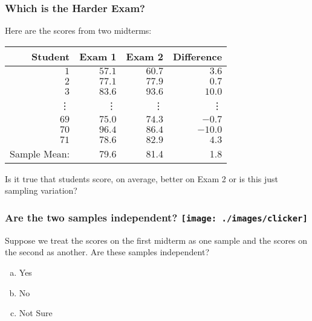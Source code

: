\begin{frame}
\frametitle{Which is the Harder Exam?}
Here are the scores from two midterms:
%
\begin{table}[!tbp]
\begin{center}
\begin{tabular}{rrrr}
\hline\hline
\multicolumn{1}{r}{Student}&\multicolumn{1}{r}{Exam 1}&\multicolumn{1}{r}{Exam 2}&\multicolumn{1}{r}{Difference}\tabularnewline
\hline
$ 1$&$57.1$&$60.7$&$  3.6$\tabularnewline
$ 2$&$77.1$&$77.9$&$  0.7$\tabularnewline
$ 3$&$83.6$&$93.6$&$ 10.0$\tabularnewline
\vdots&\vdots&\vdots&\vdots\\
$69$&$75.0$&$74.3$&$ -0.7$\tabularnewline
$70$&$96.4$&$86.4$&$-10.0$\tabularnewline
$71$&$78.6$&$82.9$&$  4.3$\tabularnewline
\hline
Sample Mean: & 79.6 & 81.4  &1.8\\
\hline
\end{tabular}
\end{center}
\end{table}

\alert{Is it true that students score, on average, better on Exam 2 or is this just sampling variation?}
\end{frame}
\begin{frame}
\frametitle{Are the two samples independent? \hfill \texttt{[image: ./images/clicker]}}
Suppose we treat the scores on the first midterm as one sample and the scores on the second as another. Are these samples independent?

\begin{enumerate}[(a)]
	\item Yes
	\item No
	\item Not Sure
\end{enumerate}


\end{frame}
